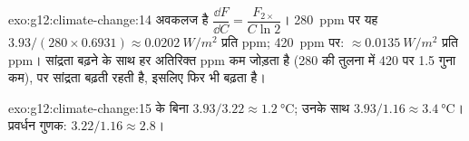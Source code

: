 \begin{solution}{exo:g12:climate-change:14}
अवकलज है $\dfrac{\dd F}{\dd C} = \dfrac{F_{2\times}}{C \ln 2}$। \qty{280}{ppm} पर यह
$3.93/(280 \times 0.6931) \approx \qty{0.0202}{W/m^2}$ प्रति ppm;
\qty{420}{ppm} पर: $\approx \qty{0.0135}{W/m^2}$ प्रति ppm। सांद्रता बढ़ने के साथ हर अतिरिक्त ppm
कम  जोड़ता है (280 की तुलना में 420 पर 1.5 गुना कम),
पर सांद्रता बढ़ती रहती है, इसलिए  फिर भी बढ़ता है।
\end{solution}

\begin{solution}{exo:g12:climate-change:15}
 के बिना $3.93/3.22 \approx \qty{1.2}{\degreeCelsius}$;
उनके साथ $3.93/1.16 \approx \qty{3.4}{\degreeCelsius}$। प्रवर्धन
गुणक: $3.22/1.16 \approx 2.8$।
\end{solution}

